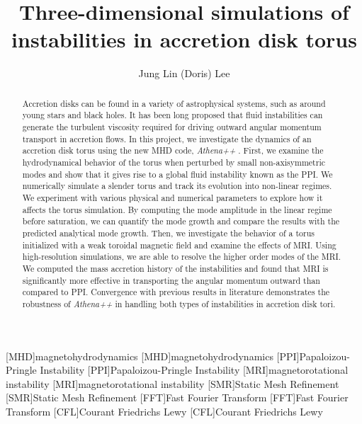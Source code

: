 \documentclass[iop,revtex4]{emulateapj}
\begin{document}
[MHD]{magnetohydrodynamics}
[MHD]{magnetohydrodynamics}
[PPI]{Papaloizou-Pringle Instability}
[PPI]{Papaloizou-Pringle Instability}
[MRI]{magnetorotational instability}
[MRI]{magnetorotational instability}
[SMR]{Static Mesh Refinement}
[SMR]{Static Mesh Refinement}
[FFT]{Fast Fourier Transform}
[FFT]{Fast Fourier Transform}
[CFL]{Courant Friedrichs Lewy}
[CFL]{Courant Friedrichs Lewy}
\newcommand{\app}{\textit{ Athena++ }}
\title{Three-dimensional simulations of instabilities in accretion disk torus}
\author{Jung Lin (Doris) Lee}
 \begin{abstract}
Accretion disks can be found in a variety of astrophysical systems, such as around young stars and black holes. It has been long proposed that fluid instabilities can generate the turbulent viscosity required for driving outward angular momentum transport in accretion flows. In this project, we investigate the dynamics of an accretion disk torus using the new \acf{MHD} code, \app . First, we examine the hydrodynamical behavior of the torus when perturbed by small non-axisymmetric modes and show that it gives rise to a global fluid instability known as the \acf{PPI}. We numerically simulate a slender torus and track its evolution into non-linear regimes. We experiment with various physical and numerical parameters to explore how it affects the torus simulation. By computing the mode amplitude in the linear regime before saturation, we can quantify the mode growth and compare the results with the predicted analytical mode growth. Then, we investigate the behavior of a torus initialized with a weak toroidal magnetic field and examine the effects of \acf{MRI}. Using high-resolution simulations, we are able to resolve the higher order modes of the \ac{MRI}. We computed the mass accretion history of the instabilities and found that \ac{MRI} is significantly more effective in transporting the angular momentum outward than compared to \ac{PPI}. Convergence with previous results in literature demonstrates the robustness of \app  in handling both types of instabilities in accretion disk tori. 
\end{abstract}
\end{document}
